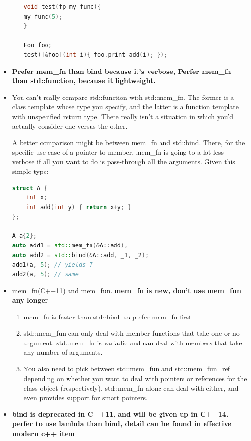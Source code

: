 \documentclass[a4paper,11pt,twoside]{book}
\begin{document}
\begin{itemize}
\begin{enumerate}
\begin{lstlisting}[frame=single, language=c++]
void test(fp my_func){
my_func(5);
}

Foo foo;
test([&foo](int i){ foo.print_add(i); });
\end{lstlisting}
	
	\end{enumerate}

	\item \textbf{Prefer mem\_fn than bind because it's verbose, Perfer mem\_fn  than std::function, because it lightweight.}
	
	\item You can't really compare std::function with std::mem\_fn. The former is a class template whose type you specify, and the latter is a function template with unspecified return type. There really isn't a situation in which you'd actually consider one versus the other.
	
	A better comparison might be between mem\_fn and std::bind. There, for the specific use-case of a pointer-to-member, mem\_fn is going to a lot less verbose if all you want to do is pass-through all the arguments. Given this simple type:
\begin{lstlisting}[frame=single, language=c++]
struct A { 
	int x;
	int add(int y) { return x+y; }
};
	
A a{2};
auto add1 = std::mem_fn(&A::add);
auto add2 = std::bind(&A::add, _1, _2);
add1(a, 5); // yields 7
add2(a, 5); // same
	\end{lstlisting}
	
	\item mem\_fn(C++11) and mem\_fun. \textbf{mem\_fn is new, don't use mem\_fun any longer}
	
	\begin{enumerate}
		\item mem\_fn is faster than std::bind.  so prefer mem\_fn first.
		
		\item std::mem\_fun can only deal with member functions that take one or no argument. std::mem\_fn is variadic and can deal with members that take any number of arguments.
		
		\item You also need to pick between std::mem\_fun and std::mem\_fun\_ref depending on whether you want to deal with pointers or references for the class object (respectively). std::mem\_fn alone can deal with either, and even provides support for smart pointers.
	\end{enumerate}

	\item \textbf{bind is deprecated in C++11, and will be given up in C++14. perfer to use lambda than bind, detail can be found in effective modern c++ item }
\end{itemize}
\end{document}
